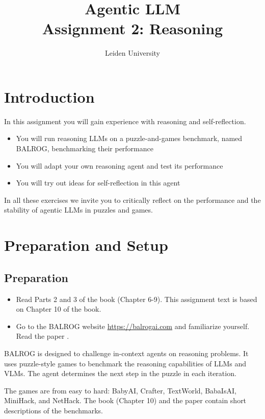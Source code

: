 \documentclass[a4]{article}
\title{Agentic LLM\\
Assignment 2: Reasoning}
\author{Leiden University}
\begin{document}
\maketitle

\section{Introduction}
In this assignment you will gain experience with reasoning and self-reflection. 
\begin{itemize}
\item You will run reasoning LLMs on a puzzle-and-games benchmark, named BALROG, benchmarking their performance
\item You will adapt your own reasoning agent and test its performance
\item You will try out ideas for self-reflection in this agent
\end{itemize}
In all these exercises we invite you to  critically reflect on the performance and the stability of agentic LLMs in puzzles and games.


\section{Preparation and Setup}
\subsection{Preparation}
\begin{itemize}
    \item  Read Parts 2 and 3 of the book (Chapter 6-9). This assignment text is based on Chapter 10 of the book.
    \item Go to the BALROG website \url{https://balrogai.com} and familiarize yourself. Read the paper \citep{paglieri2024balrog}. 
\end{itemize}
BALROG is designed to challenge in-context agents on reasoning problems.
It uses puzzle-style games to benchmark the reasoning capabilities of LLMs and VLMs. The agent determines the next step in the puzzle in each iteration.

The games are from easy to hard: BabyAI, Crafter, TextWorld, BabaIsAI, MiniHack, and NetHack. The book (Chapter 10) and the paper contain short descriptions of the benchmarks.

\end{document}
